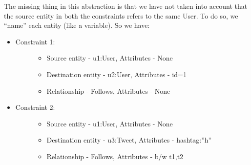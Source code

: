 \documentclass[letterpaper,10pt,english]{sphinxmanual}
\begin{document}
The missing thing in this abstraction is that we have not taken into account that the source entity in both the constraints refers to the same User. To do so, we “name” each entity (like a variable). So we have:
\begin{itemize}
\item {} \begin{description}
\item[{Constraint 1:}] \leavevmode\begin{itemize}
\item {} 
Source entity - u1:User, Attributes - None

\item {} 
Destination entity - u2:User, Attributes - id=1

\item {} 
Relationship - Follows, Attributes - None

\end{itemize}

\end{description}

\item {} \begin{description}
\item[{Constraint 2:}] \leavevmode\begin{itemize}
\item {} 
Source entity - u1:User, Attributes - None

\item {} 
Destination entity - u3:Tweet, Attributes - hashtag:”h”

\item {} 
Relationship - Follows, Attributes - b/w t1,t2

\end{itemize}

\end{description}

\end{itemize}
\end{document}

